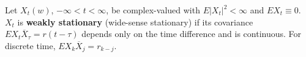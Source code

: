 Let $X_t(w)$, $-\infty < t < \infty$, be complex-valued with $E|X_t|^2 < \infty$ and $E X_t \equiv 0$. $X_t$ is \textbf{weakly stationary} (wide-sense stationary) if its covariance $E X_t \overline{X}_\tau = r(t-\tau)$ depends only on the time difference and is continuous. For discrete time, $E X_k \overline{X}_j = r_{k-j}$.
